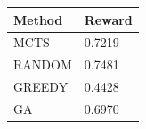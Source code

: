 \begin{tabular}{ll}
\hline
Method & Reward \\
\hline
  MCTS & 0.7219 \\
  RANDOM & 0.7481 \\
  GREEDY & 0.4428 \\
  GA & 0.6970 \\
\hline
\end{tabular}
